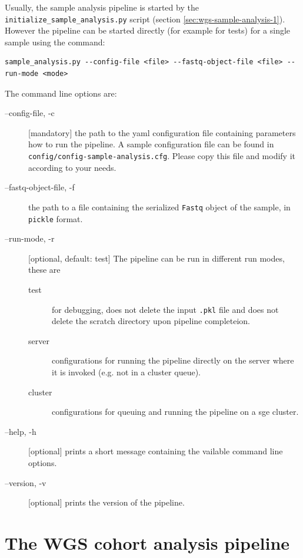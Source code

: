\documentclass[a4paper]{article}
\begin{document}
Usually, the sample analysis pipeline is started by the
\texttt{initialize\_sample\_analysis.py} script (section
\ref{sec:wgs-sample-analysis-1}). However the pipeline can be started
directly (for example for tests) for a single sample using the
command:


\begin{lstlisting}
sample_analysis.py --config-file <file> --fastq-object-file <file> --run-mode <mode>
\end{lstlisting}

The command line options are:

\begin{description}
\item[--config-file, -c] [mandatory] the path to the yaml
  configuration file containing parameters how to run the pipeline. A
  sample configuration file can be found in
  \texttt{config/config-sample-analysis.cfg}. Please copy this file
  and modify it according to your needs.
\item[--fastq-object-file, -f] the path to a file containing the
  serialized \texttt{Fastq} object of the sample, in \texttt{pickle}
  format.
\item[--run-mode, -r] [optional, default: test] The pipeline can be
  run in different run modes, these are 

  \begin{description}
  \item[test] for debugging, does not delete the input \texttt{.pkl}
    file and does not delete the scratch directory upon pipeline
    completeion.
  \item[server] configurations for running the pipeline directly on
    the server where it is invoked (e.g. not in a cluster queue).
  \item[cluster] configurations for queuing and running the pipeline
    on a sge cluster.
  \end{description}
    
\item[--help, -h] [optional] prints a short message containing the
  vailable command line options.

\item[--version, -v] [optional] prints the version of the pipeline.

\end{description}


\section{The WGS cohort analysis pipeline}
\label{sec:wgs-cohort-analysis}
\end{document}
